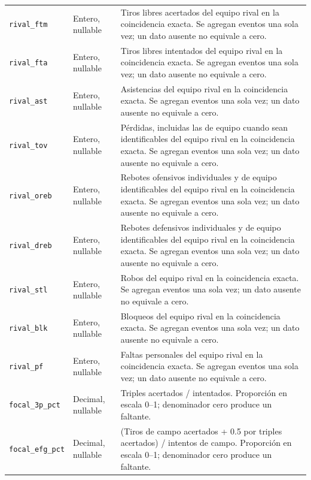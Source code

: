 \begin{longtable}{@{}>{\raggedright\arraybackslash}p{5.0cm}>{\raggedright\arraybackslash}p{1.9cm}>{\raggedright\arraybackslash}p{7.7cm}@{}}
\texttt{rival\_\allowbreak ftm} & Entero, nullable & Tiros libres acertados del equipo rival en la coincidencia exacta. Se agregan eventos una sola vez; un dato ausente no equivale a cero.\\
\texttt{rival\_\allowbreak fta} & Entero, nullable & Tiros libres intentados del equipo rival en la coincidencia exacta. Se agregan eventos una sola vez; un dato ausente no equivale a cero.\\
\texttt{rival\_\allowbreak ast} & Entero, nullable & Asistencias del equipo rival en la coincidencia exacta. Se agregan eventos una sola vez; un dato ausente no equivale a cero.\\
\texttt{rival\_\allowbreak tov} & Entero, nullable & Pérdidas, incluidas las de equipo cuando sean identificables del equipo rival en la coincidencia exacta. Se agregan eventos una sola vez; un dato ausente no equivale a cero.\\
\texttt{rival\_\allowbreak oreb} & Entero, nullable & Rebotes ofensivos individuales y de equipo identificables del equipo rival en la coincidencia exacta. Se agregan eventos una sola vez; un dato ausente no equivale a cero.\\
\texttt{rival\_\allowbreak dreb} & Entero, nullable & Rebotes defensivos individuales y de equipo identificables del equipo rival en la coincidencia exacta. Se agregan eventos una sola vez; un dato ausente no equivale a cero.\\
\texttt{rival\_\allowbreak stl} & Entero, nullable & Robos del equipo rival en la coincidencia exacta. Se agregan eventos una sola vez; un dato ausente no equivale a cero.\\
\texttt{rival\_\allowbreak blk} & Entero, nullable & Bloqueos del equipo rival en la coincidencia exacta. Se agregan eventos una sola vez; un dato ausente no equivale a cero.\\
\texttt{rival\_\allowbreak pf} & Entero, nullable & Faltas personales del equipo rival en la coincidencia exacta. Se agregan eventos una sola vez; un dato ausente no equivale a cero.\\
\texttt{focal\_\allowbreak 3p\_\allowbreak pct} & Decimal, nullable & Triples acertados / intentados. Proporción en escala 0--1; denominador cero produce un faltante.\\
\texttt{focal\_\allowbreak efg\_\allowbreak pct} & Decimal, nullable & (Tiros de campo acertados + 0.5 por triples acertados) / intentos de campo. Proporción en escala 0--1; denominador cero produce un faltante.\\

\end{longtable}
